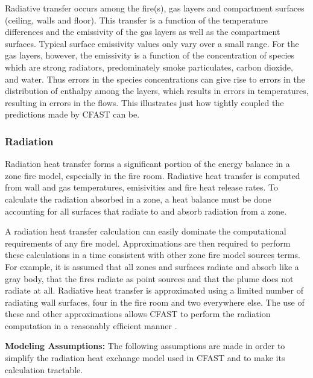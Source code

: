Radiative transfer occurs among the fire(s), gas layers and compartment surfaces (ceiling, walls and floor).  This transfer is a function of the temperature differences and the emissivity of the gas layers as well as the compartment surfaces.  Typical surface emissivity values only vary over a small range.  For the gas layers, however, the emissivity is a function of the concentration of species which are strong radiators, predominately smoke particulates, carbon dioxide, and water.  Thus errors in the species concentrations can give rise to errors in the distribution of enthalpy among the layers, which results in errors in temperatures, resulting in errors in the flows.  This illustrates just how tightly coupled the predictions made by CFAST can be.

\subsubsection{Radiation}
\label{sec:Radiation}

Radiation heat transfer forms a significant portion of the energy balance in a zone fire model, especially in the fire room.  Radiative heat transfer is computed from wall and gas temperatures, emisivities and fire heat release rates.  To calculate the radiation absorbed in a zone, a heat balance must be done accounting for all surfaces that radiate to and absorb radiation from a zone.

A radiation heat transfer calculation can easily dominate the computational requirements of any fire model.  Approximations are then required to perform these calculations in a time consistent with other zone fire model sources terms.  For example, it is assumed that all zones and surfaces radiate and absorb like a gray body, that the fires radiate as point sources and that the plume does not radiate at all.  Radiative heat transfer is approximated using a limited number of radiating wall surfaces, four in the fire room and two everywhere else.  The use of these and other approximations allows CFAST to perform the radiation computation in a reasonably efficient manner \cite{Forney_radiation}.

{ \bf Modeling Assumptions:}  The following assumptions are made in order to simplify the radiation heat exchange model used in CFAST and to make its calculation tractable.

